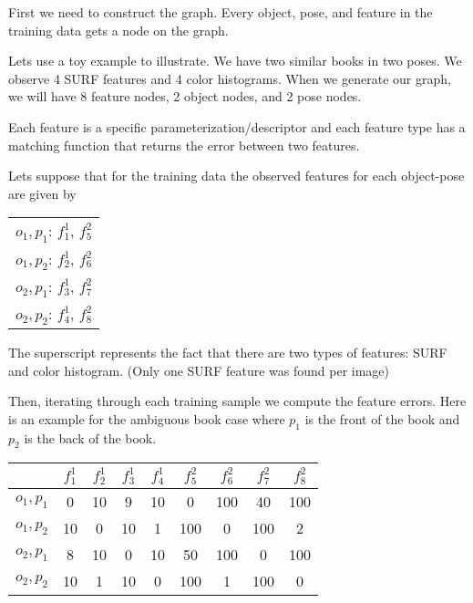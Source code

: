 \documentclass[11pt]{article}
\begin{document}
	First we need to construct the graph. Every object, pose, and feature in the training data gets a node on the graph.

	Lets use a toy example to illustrate. We have two similar books in two poses. We observe 4 SURF features and 4 color histograms. When we generate our graph, we will have 8 feature nodes, 2 object nodes, and 2 pose nodes. 

	Each feature is a specific parameterization/descriptor and each feature type has a matching function that returns the error between two features. 

	Lets suppose that for the training data the observed features for each object-pose are given by

	\begin{table}[h]
		\centering
		\begin{tabular}{c} %
			$o_1,p_1$:  $f_1^1$, $f_5^2$ \\
			$o_1,p_2$: 	$f_2^1$, $f_6^2$ \\
			$o_2,p_1$: 	$f_3^1$, $f_7^2$ \\
			$o_2,p_2$: 	$f_4^1$, $f_8^2$ 
		\end{tabular}
	\end{table}

	The superscript represents the fact that there are two types of features: SURF and color histogram. (Only one SURF feature was found per image)

	Then, iterating through each training sample we compute the feature errors. Here is an example for the ambiguous book case where $p_1$ is the front of the book and $p_2$ is the back of the book.

	\begin{table}[h]
		\centering
		\begin{tabular}{c|c c c c c c c c} %
			& $f_1^1$ & $f_2^1$ & $f_3^1$ & $f_4^1$ & $f_5^2$ & $f_6^2$ & $f_7^2$ & $f_8^2$ \\
			\hline 	    %
			$o_1,p_1$ 	& 0 	& 10 	& 9 	& 10	& 0 	& 100 	& 40 	& 100	\\
			$o_1,p_2$ 	& 10 	& 0 	& 10	& 1		& 100 	& 0 	& 100	& 2		\\
			$o_2,p_1$ 	& 8 	& 10 	& 0 	& 10	& 50 	& 100 	& 0 	& 100	\\
			$o_2,p_2$ 	& 10	& 1 	& 10	& 0 	& 100	& 1 	& 100	& 0 	
		\end{tabular}
	\end{table}
\end{document}
